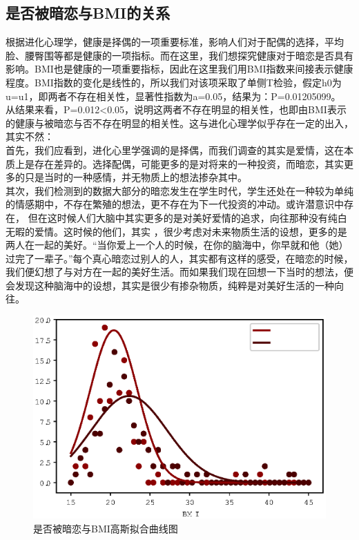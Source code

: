 \documentclass[10pt, a4paper, twocolumn]{ctexart}
\begin{document}
\subsection{是否被暗恋与BMI的关系}
根据进化心理学，健康是择偶的一项重要标准，影响人们对于配偶的选择，平均脸、腰臀围等都是健康的一项指标。而在这里，我们想探究健康对于暗恋是否具有影响。BMI也是健康的一项重要指标，因此在这里我们用BMI指数来间接表示健康程度。BMI指数的变化是线性的，所以我们对该项采取了单侧T检验，假定h0为u=u1，即两者不存在相关性，显著性指数为a=0.05，结果为：P=0.01205099。\\
\indent 从结果来看，P=0.012<0.05，说明这两者不存在明显的相关性，也即由BMI表示的健康与被暗恋与否不存在明显的相关性。这与进化心理学似乎存在一定的出入，其实不然：\\
\indent 首先，我们应看到，进化心里学强调的是择偶，而我们调查的其实是爱情，这在本质上是存在差异的。选择配偶，可能更多的是对将来的一种投资，而暗恋，其实更多的只是当时的一种感情，并无物质上的想法掺杂其中。\\
\indent 其次，我们检测到的数据大部分的暗恋发生在学生时代，学生还处在一种较为单纯的情感期中，不存在繁殖的想法，更不存在为下一代投资的冲动。或许潜意识中存在， 但在这时候人们大脑中其实更多的是对美好爱情的追求，向往那种没有纯白无暇的爱情。这时候的他们，其实 ，很少考虑对未来物质生活的设想，更多的是两人在一起的美好。“当你爱上一个人的时候，在你的脑海中，你早就和他（她）过完了一辈子。”每个真心暗恋过别人的人，其实都有这样的感受，在暗恋的时候，我们便幻想了与对方在一起的美好生活。而如果我们现在回想一下当时的想法，便会发现这种脑海中的设想，其实是很少有掺杂物质，纯粹是对美好生活的一种向往。
\begin{figure}[htbp]
	\centering
	\label{t0}
	\includegraphics[width = 0.8\linewidth]{t0.eps}
	\caption{是否被暗恋与BMI高斯拟合曲线图} %
\end{figure}
\end{document}
